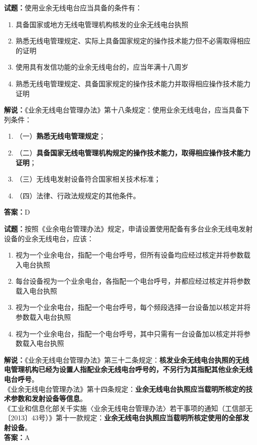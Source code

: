\documentclass{ctexbook}
\begin{document}
\bigskip


\noindent\textbf{试题：}使用业余无线电台应当具备的条件有：
\begin{enumerate}[leftmargin=3em]
\item 具备国家或地方无线电管理机构核发的业余无线电台执照
\item 熟悉无线电管理规定、实际上具备国家规定的操作技术能力但不必需取得相应的证明
\item 使用具有发信功能的业余无线电台的，应当年满十八周岁
\item 熟悉无线电管理规定、具备国家规定的操作技术能力并取得相应操作技术能力证明
\end{enumerate}
\noindent\textbf{解说：}《业余无线电台管理办法》第十八条规定：使用业余无线电台，应当具备下列条件：
\begin{enumerate}[label=, leftmargin=0.8em]
\item （一）\textbf{熟悉无线电管理规定}；
\item （二）\textbf{具备国家无线电管理机构规定的操作技术能力，取得相应操作技术能力证明}；
\item （三）无线电发射设备符合国家相关技术标准；
\item （四）法律、行政法规规定的其他条件。
\end{enumerate}
\noindent\textbf{答案：}D


\bigskip


\noindent\textbf{试题：}按照《业余电台管理办法》规定，申请设置使用配备有多台业余无线电发射设备的业余无线电台，应该：
\begin{enumerate}[leftmargin=3em]
\item 视为一个业余电台，指配一个电台呼号，但所有设备均应经过核定并将参数载入电台执照
\item 每台设备视为一个业余电台，各指配一个电台呼号，并都应经过核定并将参数载入电台执照
\item 视为一个业余电台，指配一个电台呼号，每个频段选择一台设备加以核定并将参数载入电台执照
\item 视为一个业余电台，指配一个电台呼号，其中只需有一台设备加以核定并将参数载入电台执照
\end{enumerate}
\noindent\textbf{解说：}《业余无线电台管理办法》第三十二条规定：\textbf{核发业余无线电台执照的无线电管理机构已经为设置人指配业余无线电台呼号的，不另行为其指配其他业余无线电台呼号}。\\
《业余无线电台管理办法》第十四条规定：\textbf{业余无线电台执照应当载明所核定的技术参数和发射设备等信息}。\\
《工业和信息化部关千实施〈业余无线电台管理办法〉若干事项的通知（工信部无〔2013〕43号）》第十一款规定：\textbf{业余无线电台执照应当载明所核定使用的全部发射设备}。\\\noindent\textbf{答案：}A
\end{document}
